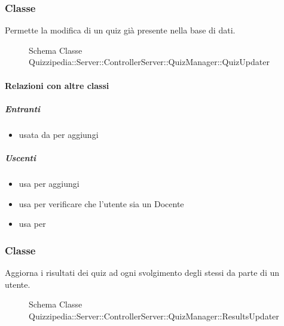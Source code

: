 \subsubsection{Classe }
Permette la modifica di un quiz già presente nella base di dati.
\begin{figure}[H]
\centering
\noindent{}
\caption[Schema Classe QuizUpdater]{Schema Classe Quizzipedia::Server::ControllerServer::QuizManager::QuizUpdater}
\end{figure}
\paragraph{Relazioni con altre classi}
\subparagraph{Entranti}
\begin{itemize}
\item usata da  per aggiungi
\end{itemize}
\subparagraph{Uscenti}
\begin{itemize}
\item usa  per aggiungi
\item usa  per verificare che l'utente sia un Docente
\item usa  per 
\end{itemize}
\subsubsection{Classe }
Aggiorna i risultati dei quiz ad ogni svolgimento degli stessi da parte di un utente.
\begin{figure}[H]
\centering
\noindent{}
\caption[Schema Classe ResultsUpdater]{Schema Classe Quizzipedia::Server::ControllerServer::QuizManager::ResultsUpdater}
\end{figure}
